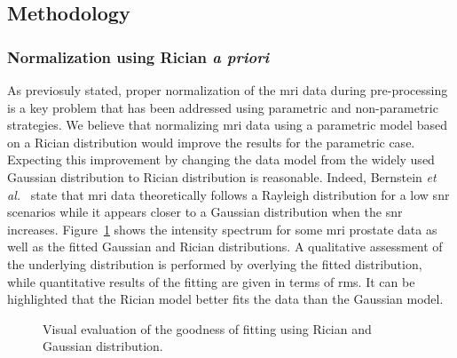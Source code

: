 \subsection{Methodology}\label{subsec:chp5:T2-norm:meth}


\subsubsection{Normalization using Rician \textit{a priori}}\label{subsubsec:chp5:T2-norm:meth:rician}
As previosuly stated, proper normalization of the \ac{mri} data during pre-processing is a key problem that has been addressed using parametric and non-parametric strategies.
We believe that normalizing \ac{mri} data using a parametric model based on a Rician distribution would improve the results for the parametric case.
Expecting this improvement by changing the data model from the widely used Gaussian distribution to Rician distribution is reasonable. 
Indeed, Bernstein \textit{et al.}~\cite{Bernstein1989} state that \ac{mri} data theoretically follows a Rayleigh distribution for a low \ac{snr} scenarios while it appears closer to a Gaussian distribution when the \ac{snr} increases.
Figure~\ref{fig:fitting} shows the intensity spectrum for some \ac{mri} prostate data as well as the fitted Gaussian and Rician distributions.
A qualitative assessment of the underlying distribution is performed by overlying the fitted distribution, while quantitative results of the fitting are given in terms of \ac{rms}.
It can be highlighted that the Rician model better fits the data than the Gaussian model.

\begin{figure}
  \centering
  \hfill
  \hfill
  \caption{Visual evaluation of the goodness of fitting using Rician and Gaussian distribution.}
  \label{fig:fitting}
\end{figure}

